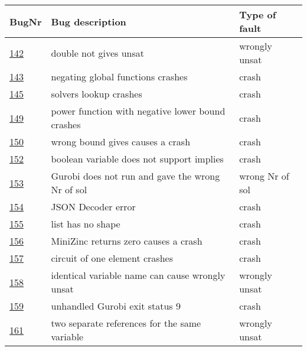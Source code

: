 \begin{table}[]
	\centering
	\begin{tabular}{lll}
		BugNr & Bug description                                           & Type of fault   \\ \toprule
		\href{https://github.com/CPMpy/cpmpy/issues/142}{142}   & double not gives unsat                                    & wrongly unsat   \\
		\href{https://github.com/CPMpy/cpmpy/issues/143}{143}   & negating global functions crashes                         & crash           \\
		\href{https://github.com/CPMpy/cpmpy/issues/145}{145}   & solvers lookup crashes                                    & crash           \\
		\href{https://github.com/CPMpy/cpmpy/issues/149}{149}   & power function with negative lower bound crashes          & crash           \\
		\href{https://github.com/CPMpy/cpmpy/issues/150}{150}   & wrong bound gives causes a crash                          & crash           \\
		\href{https://github.com/CPMpy/cpmpy/issues/152}{152}   & boolean variable does not support implies                 & crash           \\
		\href{https://github.com/CPMpy/cpmpy/issues/153}{153}   & Gurobi does not run and gave the wrong Nr of sol         & wrong Nr of sol \\
		\href{https://github.com/CPMpy/cpmpy/issues/154}{154}   & JSON Decoder error                                        & crash           \\
		\href{https://github.com/CPMpy/cpmpy/issues/155}{155}   & list has no shape                                         & crash           \\
		\href{https://github.com/CPMpy/cpmpy/issues/156}{156}   & MiniZinc returns zero causes a crash                      & crash           \\
		\href{https://github.com/CPMpy/cpmpy/issues/157}{157}   & circuit of one element crashes                            & crash           \\
		\href{https://github.com/CPMpy/cpmpy/issues/158}{158}   & identical variable name can cause wrongly unsat           & wrongly unsat   \\
		\href{https://github.com/CPMpy/cpmpy/issues/159}{159}   & unhandled Gurobi exit status 9                            & crash           \\
		\href{https://github.com/CPMpy/cpmpy/issues/161}{161}   & two separate references for the same variable             & wrongly unsat   \\

\end{tabular}
\end{table}
